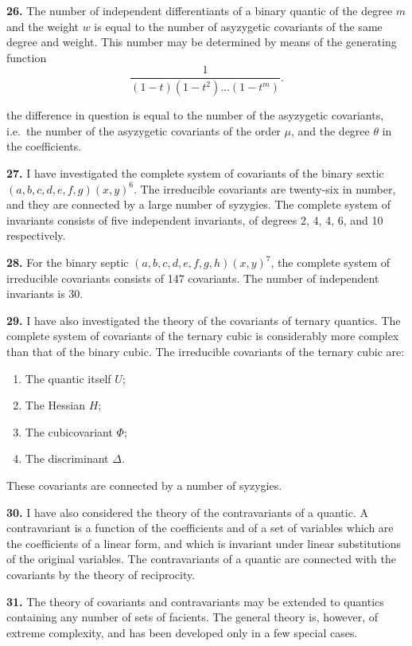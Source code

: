 \documentclass[11pt,a4paper]{book}
\begin{document}
\textbf{26.} The number of independent differentiants of a binary quantic of the degree $m$ and the weight $w$ is equal to the number of asyzygetic covariants of the same degree and weight. This number may be determined by means of the generating function
\[
\frac{1}{(1-t)(1-t^2)\ldots(1-t^m)}.
\]

\newpage
\setcounter{page}{257}

the difference in question is equal to the number of the asyzygetic covariants, i.e.\ the number of the asyzygetic covariants of the order $\mu$, and the degree $\theta$ in the coefficients.

\textbf{27.} I have investigated the complete system of covariants of the binary sextic $(a, b, c, d, e, f, g)(x, y)^6$. The irreducible covariants are twenty-six in number, and they are connected by a large number of syzygies. The complete system of invariants consists of five independent invariants, of degrees 2, 4, 4, 6, and 10 respectively.

\textbf{28.} For the binary septic $(a, b, c, d, e, f, g, h)(x, y)^7$, the complete system of irreducible covariants consists of 147 covariants. The number of independent invariants is 30.

\textbf{29.} I have also investigated the theory of the covariants of ternary quantics. The complete system of covariants of the ternary cubic is considerably more complex than that of the binary cubic. The irreducible covariants of the ternary cubic are:
\begin{enumerate}
\item The quantic itself $U$;
\item The Hessian $H$;
\item The cubicovariant $\Phi$;
\item The discriminant $\Delta$.
\end{enumerate}
These covariants are connected by a number of syzygies.

\newpage
\setcounter{page}{258}

\textbf{30.} I have also considered the theory of the contravariants of a quantic. A contravariant is a function of the coefficients and of a set of variables which are the coefficients of a linear form, and which is invariant under linear substitutions of the original variables. The contravariants of a quantic are connected with the covariants by the theory of reciprocity.

\textbf{31.} The theory of covariants and contravariants may be extended to quantics containing any number of sets of facients. The general theory is, however, of extreme complexity, and has been developed only in a few special cases.
\end{document}
